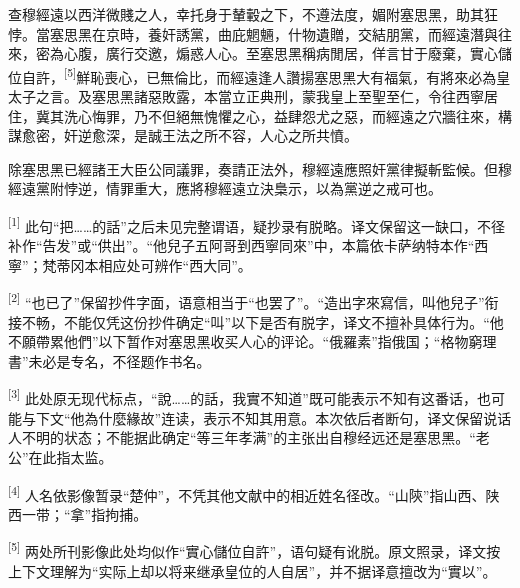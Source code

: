 查穆經遠以西洋微賤之人，幸托身于輦轂之下，不遵法度，媚附塞思黑，助其狂悖。當塞思黑在京時，養奸誘黨，曲庇魍魎，什物遺贈，交結朋黨，而經遠潛與往來，密為心腹，廣行交邀，煽惑人心。至塞思黑稱病閒居，佯言甘于廢棄，實心儲位自許，\textsuperscript{[5]}鮮恥喪心，已無倫比，而經遠逢人讚揚塞思黑大有福氣，有將來必為皇太子之言。及塞思黑諸惡敗露，本當立正典刑，蒙我皇上至聖至仁，令往西寧居住，冀其洗心悔罪，乃不但絕無愧懼之心，益肆怨尤之惡，而經遠之穴牆往來，構謀愈密，奸逆愈深，是誠王法之所不容，人心之所共憤。\par
除塞思黑已經諸王大臣公同議罪，奏請正法外，穆經遠應照奸黨律擬斬監候。但穆經遠黨附悖逆，情罪重大，應將穆經遠立決梟示，以為黨逆之戒可也。\par
\par\endgroup
\noindent\textsuperscript{[1]} 此句“把……的話”之后未见完整谓语，疑抄录有脱略。译文保留这一缺口，不径补作“告发”或“供出”。“他兒子五阿哥到西寧同來”中，本篇依卡萨纳特本作“西寧”；梵蒂冈本相应处可辨作“西大同”。\par\smallskip
\noindent\textsuperscript{[2]} “也已了”保留抄件字面，语意相当于“也罢了”。“造出字來寫信，叫他兒子”衔接不畅，不能仅凭这份抄件确定“叫”以下是否有脱字，译文不擅补具体行为。“他不願帶累他們”以下暂作对塞思黑收买人心的评论。“俄羅素”指俄国；“格物窮理書”未必是专名，不径题作书名。\par\smallskip
\noindent\textsuperscript{[3]} 此处原无现代标点，“說……的話，我實不知道”既可能表示不知有这番话，也可能与下文“他為什麼緣故”连读，表示不知其用意。本次依后者断句，译文保留说话人不明的状态；不能据此确定“等三年孝满”的主张出自穆经远还是塞思黑。“老公”在此指太监。\par\smallskip
\noindent\textsuperscript{[4]} 人名依影像暂录“楚仲”，不凭其他文献中的相近姓名径改。“山陝”指山西、陕西一带；“拿”指拘捕。\par\smallskip
\noindent\textsuperscript{[5]} 两处所刊影像此处均似作“實心儲位自許”，语句疑有讹脱。原文照录，译文按上下文理解为“实际上却以将来继承皇位的人自居”，并不据译意擅改为“實以”。\par\smallskip
